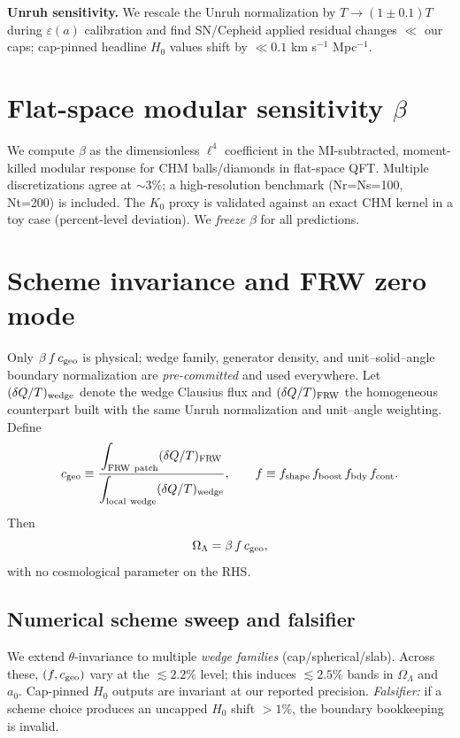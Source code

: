 \documentclass[aps,prd,preprint,onecolumn,longbibliography,nofootinbib]{revtex4-2}
\theoremstyle{plain}
\theoremstyle{remark}
\newcommand{\OmL}{\Omega_\Lambda}
\newcommand{\Hzero}{H_0}
\newcommand{\be}{\beta}
\newcommand{\eps}{\varepsilon}
\begin{document}
\textbf{Unruh sensitivity.} We rescale the Unruh normalization by $T\to (1\pm0.1)T$ during $\eps(a)$ calibration and find SN/Cepheid applied residual changes $\ll$ our caps; cap-pinned headline $\Hzero$ values shift by $\ll 0.1$ km s$^{-1}$ Mpc$^{-1}$.

\section{Flat-space modular sensitivity \texorpdfstring{$\be$}{beta}}
We compute $\be$ as the dimensionless $\ell^4$ coefficient in the MI-subtracted, moment-killed modular response for CHM balls/diamonds in flat-space QFT. Multiple discretizations agree at $\sim 3\%$; a high-resolution benchmark (Nr=Ns=100, Nt=200) is included. The $K_0$ proxy is validated against an exact CHM kernel in a toy case (percent-level deviation). We \emph{freeze} $\be$ for all predictions.

\section{Scheme invariance and FRW zero mode}\label{sec:frw_zero}
Only $\be\,f\,c_{\rm geo}$ is physical; wedge family, generator density, and unit–solid–angle boundary normalization are \emph{pre-committed} and used everywhere. Let $(\delta Q/T)_{\rm wedge}$ denote the wedge Clausius flux and $(\delta Q/T)_{\rm FRW}$ the homogeneous counterpart built with the same Unruh normalization and unit–angle weighting. Define
\begin{equation}
c_{\rm geo}\equiv \frac{\displaystyle\int_{\rm FRW\ patch}(\delta Q/T)_{\rm FRW}}
{\displaystyle\int_{\rm local\ wedge}(\delta Q/T)_{\rm wedge}},\qquad
f\equiv f_{\rm shape}\,f_{\rm boost}\,f_{\rm bdy}\,f_{\rm cont}.
\end{equation}
Then
\begin{equation}
\OmL=\be\,f\,c_{\rm geo},
\end{equation}
with no cosmological parameter on the RHS.

\subsection*{Numerical scheme sweep and falsifier}
We extend $\theta$-invariance to multiple \emph{wedge families} (cap/spherical/slab). Across these, \((f,c_{\rm geo})\) vary at the $\lesssim 2.2\%$ level; this induces $\lesssim 2.5\%$ bands in $\OmL$ and $a_0$. Cap-pinned $\Hzero$ outputs are invariant at our reported precision. \emph{Falsifier:} if a scheme choice produces an uncapped $\Hzero$ shift $>1\%$, the boundary bookkeeping is invalid.
\end{document}
